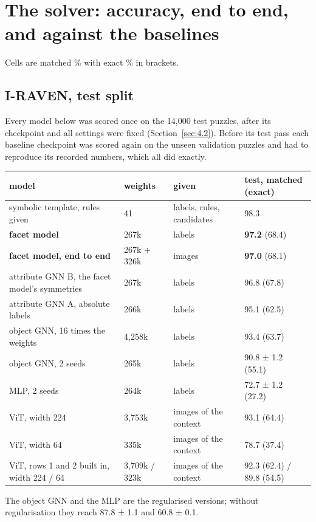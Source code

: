 \chapter{The solver: accuracy, end to end, and against the baselines}\label{ch:5}

Cells are matched \% with exact \% in brackets.

\section{I-RAVEN, test split}\label{sec:5.1}

Every model below was scored once on the 14,000 test puzzles, after its checkpoint and all settings were fixed (Section~\ref{sec:4.2}). Before its test pass each baseline checkpoint was scored again on the unseen validation puzzles and had to reproduce its recorded numbers, which all did exactly.

\begin{center}\small
\begin{tabularx}{\linewidth}{@{}YlYY@{}}
\toprule
model & weights & given & test, matched (exact) \\
\midrule
symbolic template, rules given & 41 & labels, rules, candidates & 98.3 \\
\textbf{facet model} & 267k & labels & \textbf{97.2} (68.4) \\
\textbf{facet model, end to end} & 267k + 326k & images & \textbf{97.0} (68.1) \\
attribute GNN B, the facet model's symmetries & 267k & labels & 96.8 (67.8) \\
attribute GNN A, absolute labels & 266k & labels & 95.1 (62.5) \\
object GNN, 16 times the weights & 4,258k & labels & 93.4 (63.7) \\
object GNN, 2 seeds & 265k & labels & 90.8 ± 1.2 (55.1) \\
MLP, 2 seeds & 264k & labels & 72.7 ± 1.2 (27.2) \\
ViT, width 224 & 3,753k & images of the context & 93.1 (64.4) \\
ViT, width 64 & 335k & images of the context & 78.7 (37.4) \\
ViT, rows 1 and 2 built in, width 224 / 64 & 3,709k / 323k & images of the context & 92.3 (62.4) / 89.8 (54.5) \\
\bottomrule
\end{tabularx}
\end{center}

The object GNN and the MLP are the regularised versions; without regularisation they reach 87.8 ± 1.1 and 60.8 ± 0.1.

